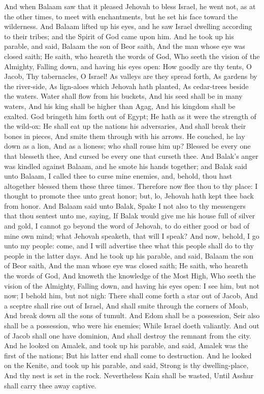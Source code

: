 And when Balaam saw that it pleased Jehovah to bless Israel, he went not, as at the other times, to meet with enchantments, but he set his face toward the wilderness. And Balaam lifted up his eyes, and he saw Israel dwelling according to their tribes; and the Spirit of God came upon him. And he took up his parable, and said, Balaam the son of Beor saith, And the man whose eye was closed saith;  He saith, who heareth the words of God, Who seeth the vision of the Almighty, Falling down, and having his eyes open:  How goodly are thy tents, O Jacob, Thy tabernacles, O Israel!  As valleys are they spread forth, As gardens by the river-side, As lign-aloes which Jehovah hath planted, As cedar-trees beside the waters.  Water shall flow from his buckets, And his seed shall be in many waters, And his king shall be higher than Agag, And his kingdom shall be exalted.  God bringeth him forth out of Egypt; He hath as it were the strength of the wild-ox: He shall eat up the nations his adversaries, And shall break their bones in pieces, And smite them through with his arrows.  He couched, he lay down as a lion, And as a lioness; who shall rouse him up? Blessed be every one that blesseth thee, And cursed be every one that curseth thee.  And Balak’s anger was kindled against Balaam, and he smote his hands together; and Balak said unto Balaam, I called thee to curse mine enemies, and, behold, thou hast altogether blessed them these three times. Therefore now flee thou to thy place: I thought to promote thee unto great honor; but, lo, Jehovah hath kept thee back from honor. And Balaam said unto Balak, Spake I not also to thy messengers that thou sentest unto me, saying, If Balak would give me his house full of silver and gold, I cannot go beyond the word of Jehovah, to do either good or bad of mine own mind; what Jehovah speaketh, that will I speak? And now, behold, I go unto my people: come, and I will advertise thee what this people shall do to thy people in the latter days. And he took up his parable, and said, Balaam the son of Beor saith, And the man whose eye was closed saith;  He saith, who heareth the words of God, And knoweth the knowledge of the Most High, Who seeth the vision of the Almighty, Falling down, and having his eyes open:  I see him, but not now; I behold him, but not nigh: There shall come forth a star out of Jacob, And a sceptre shall rise out of Israel, And shall smite through the corners of Moab, And break down all the sons of tumult.  And Edom shall be a possession, Seir also shall be a possession, who were his enemies; While Israel doeth valiantly.  And out of Jacob shall one have dominion, And shall destroy the remnant from the city.  And he looked on Amalek, and took up his parable, and said, Amalek was the first of the nations; But his latter end shall come to destruction.  And he looked on the Kenite, and took up his parable, and said, Strong is thy dwelling-place, And thy nest is set in the rock.  Nevertheless Kain shall be wasted, Until Asshur shall carry thee away captive.  